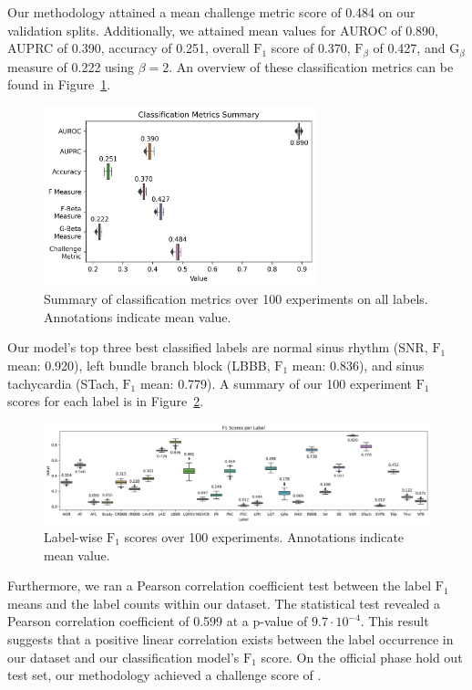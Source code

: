 \documentclass[twocolumn]{cinc}
\begin{document}
Our methodology attained a mean challenge metric score of 0.484 on our validation splits.
Additionally, we attained mean values for AUROC of 0.890, AUPRC of 0.390, accuracy of 0.251, overall $\text{F}_1$ score of 0.370, $\text{F}_\beta$ of 0.427, and $\text{G}_\beta$ measure of 0.222 using $\beta = 2$.
An overview of these classification metrics can be found in Figure~\ref{fig:classification_metrics_summary}.

\begin{figure}[hb]
  \centering
  \includegraphics[width=7.9cm]{fig/classification_metrics.png}
  \caption{Summary of classification metrics over 100 experiments on all labels. Annotations indicate mean value.}
  \label{fig:classification_metrics_summary}
\end{figure}

Our model's top three best classified labels are normal sinus rhythm (SNR, $\text{F}_1$ mean: 0.920), left bundle branch block (LBBB, $\text{F}_1$ mean: 0.836), and sinus tachycardia (STach, $\text{F}_1$ mean: 0.779).
A summary of our 100 experiment $\text{F}_1$ scores for each label is in Figure~\ref{fig:f1_score}.

\begin{figure}[ht]
  \centering
  \includegraphics[width=17.0cm]{fig/label_f1s.png}
  \caption{Label-wise $\text{F}_1$ scores over 100 experiments. Annotations indicate mean value.}
  \label{fig:f1_score}
\end{figure}

Furthermore, we ran a Pearson correlation coefficient test between the label $\text{F}_1$ means and the label counts within our dataset.
The statistical test revealed a Pearson correlation coefficient of 0.599 at a p-value of $9.7 \cdot 10^{-4}$.
This result suggests that a positive linear correlation exists between the label occurrence in our dataset and our classification model's $\text{F}_1$ score.
On the official phase hold out test set, our methodology achieved a challenge score of \officialscore.
\end{document}

